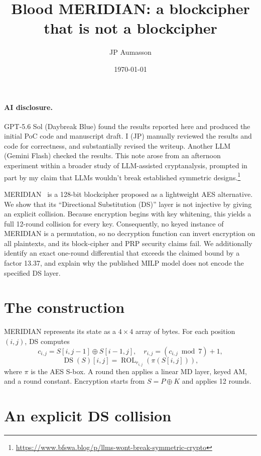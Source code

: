 \documentclass[10pt,twocolumn]{article}
\title{\vspace{-2.1em}\bfseries\Large Blood MERIDIAN: a blockcipher
that is not a blockcipher}
\author{JP Aumasson}
\date{\today}
\begin{document}
\maketitle
\thispagestyle{empty}


\paragraph{AI disclosure.}
GPT-5.6 Sol (Daybreak Blue) found the results
reported here and produced the initial PoC code and manuscript
draft. I (JP) manually reviewed the results and code for
correctness, and substantially revised the writeup. Another LLM
(Gemini Flash) checked the results. This note arose from an
afternoon experiment within a broader study of LLM-assisted
cryptanalysis, prompted in part by my claim that LLMs wouldn't break
established symmetric
designs.\footnote{\url{https://www.bfswa.blog/p/llms-wont-break-symmetric-crypto}}


\medskip

MERIDIAN~\cite{meridian} is a 128-bit blockcipher proposed as a
lightweight AES alternative.  We show that its  ``Directional
Substitution (DS)'' layer is not injective by giving an explicit
collision. Because encryption begins with key whitening, this yields a
full 12-round collision for every key. 
Consequently, no keyed instance of MERIDIAN is a permutation, so no
decryption function can invert encryption on all plaintexts, and its
block-cipher and PRP security claims fail.
We additionally identify an exact one-round differential that exceeds
the claimed bound by a factor 13.37, and explain why the published MILP
model does not encode the specified DS layer.

\section{The construction}

MERIDIAN represents its state as a $4\times4$ array of bytes. For each position $(i,j)$, DS computes
\[
c_{i,j}=S[i,j-1]\oplus S[i-1,j],\quad
r_{i,j}=(c_{i,j}\bmod 7)+1,
\]
\[
\operatorname{DS}(S)[i,j]
=\operatorname{ROL}_{r_{i,j}}(\pi(S[i,j])),
\]
where $\pi$ is the AES S-box. A round then applies a linear MD layer,
keyed AM, and a round constant. Encryption starts from $S=P\oplus K$ and
applies 12 rounds.

\section{An explicit DS collision}
\end{document}
